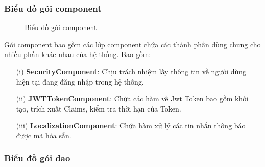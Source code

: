 \documentclass[../DoAn.tex]{subfiles}
\begin{document}
\subsubsection{Biểu đồ gói component}

\begin{figure}[H]
    \centering
    \caption{Biểu đồ gói component}
    \label{fig:Fig4}
\end{figure}
Gói component bao gồm các lớp component chứa các thành phần dùng chung cho nhiều phần khác nhau của hệ thống. Bao gồm:
\begin{enumerate}
    \item [(i)] \textbf{SecurityComponent}: Chịu trách nhiệm lấy thông tin về người dùng hiện tại đang đăng nhập trong hệ thống.
    \item [(ii)]\textbf{JWTTokenComponent}: Chứa các hàm về Jwt Token  bao gồm khởi tạo, trích xuất Claims, kiểm tra thời hạn của Token.
    \item[(iii)] \textbf{LocalizationComponent}: Chứa hàm xử lý các tin nhắn thông báo được mã hóa sẵn.
\end{enumerate}

\subsubsection{Biểu đồ gói dao}
\end{document}
